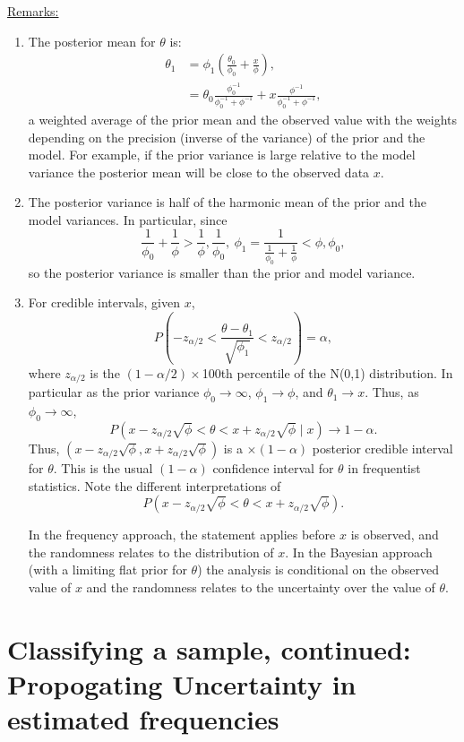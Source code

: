 \documentclass{article}[11pt]
\begin{document}
\underline{Remarks:}
\begin{enumerate}
\item The posterior mean for $\theta$ is:
\begin{align}
\theta_1 & =\phi_1 \left(\frac{\theta_0}{\phi_0} + \frac{x}{\phi}
\right), \\
&=\theta_0 \frac{\phi_0^{-1}}{\phi_0^{-1}+ \phi^{-1}} + x
\frac{\phi^{-1}}{\phi_0^{-1}+ \phi^{-1}},
\end{align}
a weighted average of the prior mean and the observed value with the
weights depending on the precision (inverse of the variance) of the
prior and the model.  For example, if the prior variance is large
relative to the model variance the posterior mean will be close to the
observed data $x$.
\item The posterior variance is half of the harmonic mean of the prior
  and the model variances.  In particular, since
$$\frac{1}{\phi_0}+\frac{1}{\phi} > \frac{1}{\phi}, \frac{1}{\phi_0},\
\phi_1=\frac{1}{\frac{1}{\phi_0}+\frac{1}{\phi}} < \phi, \phi_0,$$
so the posterior variance is smaller than the prior and model
variance.
\item For credible intervals, given $x$,
$$P\left( -z_{\alpha/2} < \frac{\theta - \theta_1}{\sqrt{\phi_1}} <
  z_{\alpha/2} \right) = \alpha,$$
where $z_{\alpha/2}$ is the $(1-\alpha/2) \times$100th percentile of the
N(0,1) distribution.  In particular as the prior variance $\phi_0
\rightarrow \infty$, $\phi_1 \rightarrow \phi$, and $\theta_1
\rightarrow x$.  Thus, as $\phi_0 \rightarrow \infty$,
$$P\left( x-z_{\alpha/2} \sqrt{\phi} < \theta < x+
  z_{\alpha/2}\sqrt{\phi} \mid x \right) \rightarrow 1-\alpha.$$
Thus, $\left( x-z_{\alpha/2} \sqrt{\phi}, x+
  z_{\alpha/2}\sqrt{\phi} \right)$ is a $\times(1-\alpha)$
posterior credible interval for $\theta$.  This is the usual $(1-\alpha)$ confidence interval for $\theta$ in
frequentist statistics.  Note the different interpretations of
$$P\left( x-z_{\alpha/2} \sqrt{\phi} < \theta <
  x+z_{\alpha/2}\sqrt{\phi} \right).$$

In the frequency approach, the statement applies before $x$ is observed,
and the randomness relates to the distribution of $x$.  In the Bayesian
approach (with a limiting flat prior for $\theta$) the analysis is conditional
on the observed value of $x$ and the randomness relates to the
uncertainty over the value of $\theta$.

\end{enumerate}

\section{Classifying a sample, continued: Propogating Uncertainty in estimated frequencies}
\end{document}
